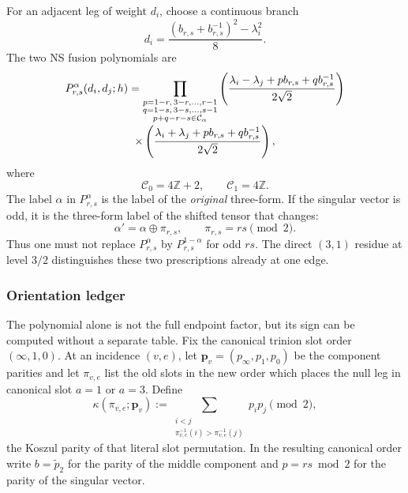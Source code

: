 \documentclass[11pt]{article}
\begin{document}
For an adjacent leg of weight \(d_i\), choose a continuous branch
\begin{equation}
 d_i=\frac{(b_{r,s}+b_{r,s}^{-1})^2-\lambda_i^2}{8}.
 \label{eq:external-momentum}
\end{equation}
The two NS fusion polynomials are
\begin{multline}
 P_{r,s}^{\alpha}(d_i,d_j;h)
 =\prod_{\substack{
 p=1-r,\,3-r,\ldots,r-1\\
 q=1-s,\,3-s,\ldots,s-1\\
 p+q-r-s\in\mathcal C_\alpha}}
 \left(
  \frac{\lambda_i-\lambda_j+p b_{r,s}+q b_{r,s}^{-1}}
       {2\sqrt2}
 \right)
 \notag\\[-0.2em]
 \times
 \left(
  \frac{\lambda_i+\lambda_j+p b_{r,s}+q b_{r,s}^{-1}}
       {2\sqrt2}
 \right),
 \label{eq:fusion-polynomial}
\end{multline}
where
\begin{equation}
 \mathcal C_0=4\mathbb Z+2,
 \qquad
 \mathcal C_1=4\mathbb Z.
 \label{eq:fusion-congruence}
\end{equation}
The label \(\alpha\) in \(P_{r,s}^{\alpha}\) is the label of the
\emph{original} three-form.  If the singular vector is odd, it is the
three-form label of the shifted tensor that changes:
\begin{equation}
 \alpha' = \alpha\oplus \pi_{r,s},
 \qquad \pi_{r,s}=rs\pmod2.
 \label{eq:null-sector-transport}
\end{equation}
Thus one must not replace \(P_{r,s}^{\alpha}\) by
\(P_{r,s}^{1-\alpha}\) for odd \(rs\).  The direct \((3,1)\) residue at
level \(3/2\) distinguishes these two prescriptions already at one edge.

\subsubsection{Orientation ledger}

The polynomial alone is not the full endpoint factor, but its sign can be
computed without a separate table.  Fix the canonical trinion slot order
\((\infty,1,0)\).  At an incidence \((v,e)\), let
\(\bm p_v=(p_\infty,p_1,p_0)\) be the component parities and let
\(\pi_{v,e}\) list the old slots in the new order which places the null leg
in canonical slot \(a=1\) or \(a=3\).  Define
\begin{equation}
 \kappa(\pi_{v,e};\bm p_v)
 :=\sum_{\substack{i<j\\
       \pi_{v,e}^{-1}(i)>\pi_{v,e}^{-1}(j)}}p_i p_j
 \pmod2,
 \label{eq:endpoint-koszul-permutation}
\end{equation}
the Koszul parity of that literal slot permutation.  In the resulting
canonical order write \(b=\widetilde p_2\) for the parity of the middle
component and \(p=rs\bmod2\) for the parity of the singular vector.
\end{document}

